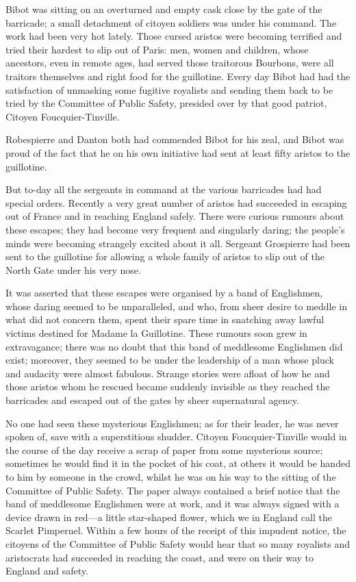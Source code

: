 Bibot was sitting on an overturned and empty cask close by the gate of the barricade; a small detachment of citoyen soldiers was under his command. The work had been very hot lately. Those cursed aristos were becoming terrified and tried their hardest to slip out of Paris: men, women and children, whose ancestors, even in remote ages, had served those traitorous Bourbons, were all traitors themselves and right food for the guillotine. Every day Bibot had had the satisfaction of unmasking some fugitive royalists and sending them back to be tried by the Committee of Public Safety, presided over by that good patriot, Citoyen Foucquier-Tinville.

Robespierre and Danton both had commended Bibot for his zeal, and Bibot was proud of the fact that he on his own initiative had sent at least fifty aristos to the guillotine.

But to-day all the sergeants in command at the various barricades had had special orders. Recently a very great number of aristos had succeeded in escaping out of France and in reaching England safely. There were curious rumours about these escapes; they had become very frequent and singularly daring; the people's minds were becoming strangely excited about it all. Sergeant Grospierre had been sent to the guillotine for allowing a whole family of aristos to slip out of the North Gate under his very nose.

It was asserted that these escapes were organised by a band of Englishmen, whose daring seemed to be unparalleled, and who, from sheer desire to meddle in what did not concern them, spent their spare time in snatching away lawful victims destined for Madame la Guillotine. These rumours soon grew in extravagance; there was no doubt that this band of meddlesome Englishmen did exist; moreover, they seemed to be under the leadership of a man whose pluck and audacity were almost fabulous. Strange stories were afloat of how he and those aristos whom he rescued became suddenly invisible as they reached the barricades and escaped out of the gates by sheer supernatural agency.

No one had seen these mysterious Englishmen; as for their leader, he was never spoken of, save with a superstitious shudder. Citoyen Foucquier-Tinville would in the course of the day receive a scrap of paper from some mysterious source; sometimes he would find it in the pocket of his coat, at others it would be handed to him by someone in the crowd, whilst he was on his way to the sitting of the Committee of Public Safety. The paper always contained a brief notice that the band of meddlesome Englishmen were at work, and it was always signed with a device drawn in red\allowbreak---\allowbreak a little star-shaped flower, which we in England call the Scarlet Pimpernel. Within a few hours of the receipt of this impudent notice, the citoyens of the Committee of Public Safety would hear that so many royalists and aristocrats had succeeded in reaching the coast, and were on their way to England and safety.

